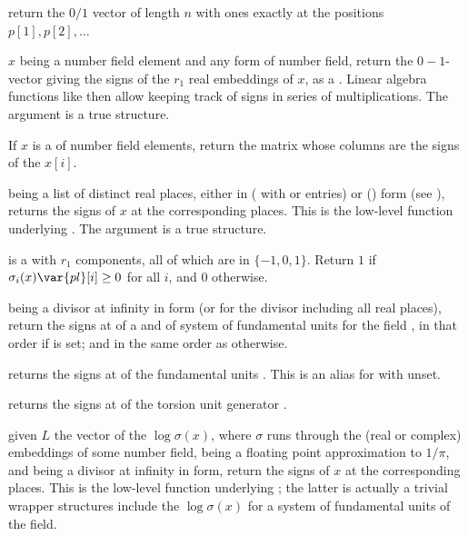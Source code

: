  return the $0/1$ vector of length
$n$ with ones exactly at the positions $p[1], p[2], \ldots$

 $x$ being a number field element and 
any form of number field, return the $0-1$-vector giving the signs of the
$r_1$ real embeddings of $x$, as a . Linear algebra functions
like  then allow keeping track of signs in series of
multiplications. The argument  is a true  structure.

If $x$ is a  of number field elements, return the matrix whose
columns are the signs of the $x[i]$.

  being a list of
distinct real places, either in  ( with  or
 entries) or  () form (see
), returns the signs of $x$ at the corresponding
places. This is the low-level function underlying . The argument
 is a true  structure.

  is a
 with $r_1$ components, all of which are in $\{-1,0,1\}$.
Return $1$ if $\sigma_i(x) \var{pl}[i] \geq 0$ for all $i$, and $0$ otherwise.

 being a divisor at infinity in  form (or 
for the divisor including all real places), return the signs at 
of a  and of system of fundamental units for the field
, in that order if  is set; and in the same order as
 otherwise.

 returns the signs at 
of the fundamental units . This is an alias for
 with  unset.

 returns the signs at 
of the torsion unit generator .

 given $L$
the vector of the $\log \sigma(x)$, where $\sigma$ runs through the (real
or complex) embeddings of some number field,  being
a floating point approximation to $1/\pi$, and  being a divisor
at infinity in  form, return the signs of $x$
at the corresponding places. This is the low-level function underlying
; the latter is actually a trivial wrapper
 structures include the $\log \sigma(x)$ for a system of fundamental
units of the field.

